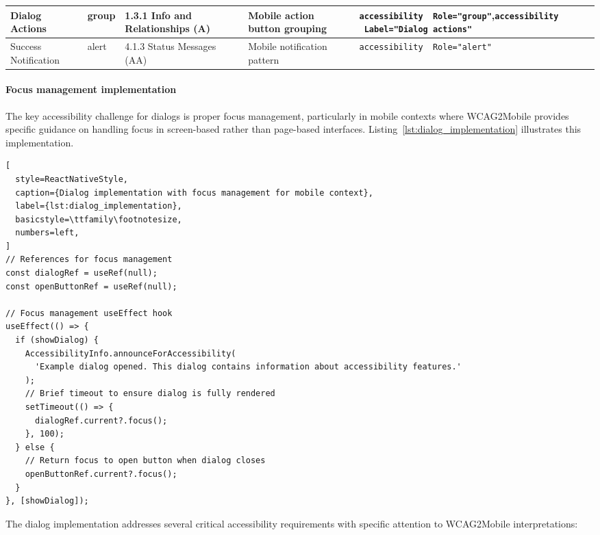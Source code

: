 \begin{longtable}[c]{|C{2.5cm}|C{2cm}|C{2.8cm}|C{2.8cm}|C{4.7cm}|}
\hline
Dialog Actions & group & 1.3.1 Info and Relationships (A) & Mobile action button grouping & \texttt{accessibility \ Role="group"},\newline \texttt{accessibility \ Label="Dialog actions"} \\
\hline
Success Notification & alert & 4.1.3 Status Messages (AA) & Mobile notification pattern & \texttt{accessibility \ Role="alert"} \\
\end{longtable}
\FloatBarrier

\paragraph{Focus management implementation}

The key accessibility challenge for dialogs is proper focus management, particularly in mobile contexts where WCAG2Mobile provides specific guidance on handling focus in screen-based rather than page-based interfaces. Listing~\ref{lst:dialog_implementation} illustrates this implementation.

\begin{lstlisting}[
  style=ReactNativeStyle,
  caption={Dialog implementation with focus management for mobile context},
  label={lst:dialog_implementation},
  basicstyle=\ttfamily\footnotesize,
  numbers=left,
]
// References for focus management
const dialogRef = useRef(null);
const openButtonRef = useRef(null);

// Focus management useEffect hook
useEffect(() => {
  if (showDialog) {
    AccessibilityInfo.announceForAccessibility(
      'Example dialog opened. This dialog contains information about accessibility features.'
    );
    // Brief timeout to ensure dialog is fully rendered
    setTimeout(() => {
      dialogRef.current?.focus();
    }, 100);
  } else {
    // Return focus to open button when dialog closes
    openButtonRef.current?.focus();
  }
}, [showDialog]);
\end{lstlisting}
\FloatBarrier

The dialog implementation addresses several critical accessibility requirements with specific attention to WCAG2Mobile interpretations:

